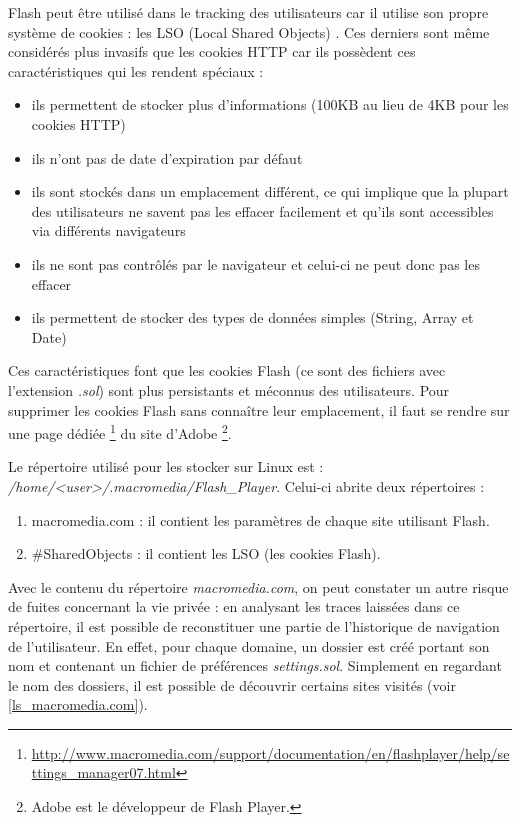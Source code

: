 Flash peut être utilisé dans le tracking des utilisateurs car il utilise son propre système de cookies : les LSO (Local Shared Objects) \cite{conf/aaaiss/SoltaniCMTH10}. Ces derniers sont même considérés plus invasifs que les cookies HTTP car ils possèdent ces caractéristiques qui les rendent spéciaux \cite{flash_lso} :
\begin{itemize}
  \item ils permettent de stocker plus d'informations (100KB au lieu de 4KB pour les cookies HTTP)
  \item ils n'ont pas de date d'expiration par défaut
  \item ils sont stockés dans un emplacement différent, ce qui implique que la plupart des utilisateurs ne savent pas les effacer facilement et qu'ils sont accessibles via différents navigateurs
  \item ils ne sont pas contrôlés par le navigateur et celui-ci ne peut donc pas les effacer
  \item ils permettent de stocker des types de données simples (String, Array et Date)
\end{itemize}

Ces caractéristiques font que les cookies Flash (ce sont des fichiers avec l'extension \textit{.sol}) sont plus persistants et méconnus des utilisateurs. Pour supprimer les cookies Flash sans connaître leur emplacement, il faut se rendre sur une page dédiée \footnote{\url{http://www.macromedia.com/support/documentation/en/flashplayer/help/settings_manager07.html}} du site d'Adobe \footnote{Adobe est le développeur de Flash Player.}.
\newline

Le répertoire utilisé pour les stocker sur Linux est :\\
\mbox{\textit{/home/<user>/.macromedia/Flash\_Player}}. Celui-ci abrite deux répertoires :
\begin{enumerate}
  \item macromedia.com : il contient les paramètres de chaque site utilisant Flash.
  \item \#SharedObjects : il contient les LSO (les cookies Flash).
\end{enumerate}

Avec le contenu du répertoire \textit{macromedia.com}, on peut constater un autre risque de fuites concernant la vie privée : en analysant les traces laissées dans ce répertoire, il est possible de reconstituer une partie de l'historique de navigation de l'utilisateur. En effet, pour chaque domaine, un dossier est créé portant son nom et contenant un fichier de préférences \textit{settings.sol}. Simplement en regardant le nom des dossiers, il est possible de découvrir certains sites visités (voir \autoref{ls_macromedia.com}).

